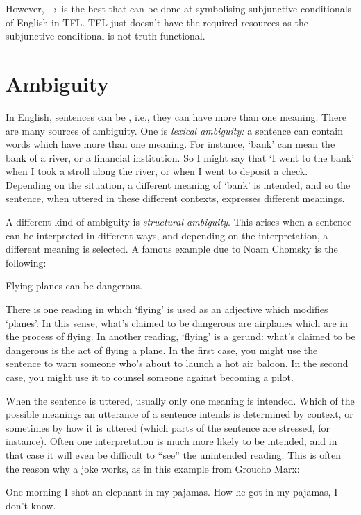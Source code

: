 However, $\rightarrow$ is the best that can be done at symbolising subjunctive conditionals of English in TFL. TFL just doesn't have the required resources as the subjunctive conditional is not truth-functional.



\chapter{Ambiguity}\label{s:AmbiguityTFL}

In English, sentences can be , i.e., they can have more than one meaning.  There are many sources of ambiguity. One is \emph{lexical ambiguity:} a sentence can contain words which have more than one meaning.  For instance, `bank' can mean the bank of a river, or a financial institution. So I might say that `I went to the bank' when I took a stroll along the river, or when I went to deposit a check.  Depending on the situation, a different meaning of `bank' is intended, and so the sentence, when uttered in these different contexts, expresses different meanings.

A different kind of ambiguity is \emph{structural ambiguity}.  This arises when a sentence can be interpreted in different ways, and depending on the interpretation, a different meaning is selected.  A famous example due to Noam Chomsky is the following:
\begin{earg}
	\prem Flying planes can be dangerous.
\end{earg}
There is one reading in which `flying' is used as an adjective which modifies `planes'. In this sense, what's claimed to be dangerous are airplanes which are in the process of flying.  In another reading, `flying' is a gerund: what's claimed to be dangerous is the act of flying a plane.  In the first case, you might use the sentence to warn someone who's about to launch a hot air baloon.  In the second case, you might use it to counsel someone against becoming a pilot.

When the sentence is uttered, usually only one meaning is intended. Which of the possible meanings an utterance of a sentence intends is determined by context, or sometimes by how it is uttered (which parts of the sentence are stressed, for instance). Often one interpretation is much more likely to be intended, and in that case it will even be difficult to ``see'' the unintended reading.  This is often the reason why a joke works, as in this example from Groucho Marx:
\begin{earg}
	\prem One morning I shot an elephant in my pajamas.
	\prem How he got in my pajamas, I don't know.
\end{earg}


